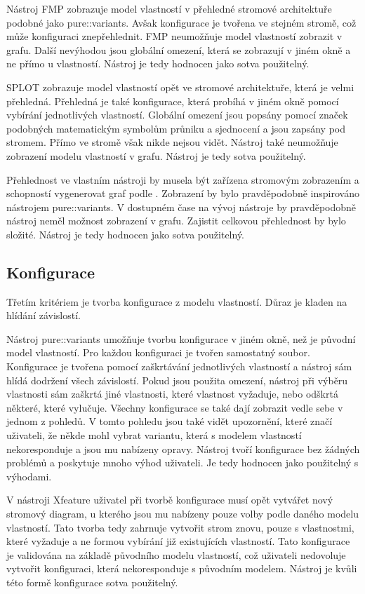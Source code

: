 Nástroj FMP zobrazuje model vlastností v přehledné stromové architektuře podobné jako pure::variants. Avšak konfigurace je tvořena ve stejném stromě, což může konfiguraci znepřehlednit. FMP neumožňuje model vlastností zobrazit v grafu. Další nevýhodou jsou globální omezení, která se zobrazují v jiném okně a ne přímo u vlastností. Nástroj je tedy hodnocen jako sotva použitelný.

SPLOT zobrazuje model vlastností opět ve stromové architektuře, která je velmi přehledná. Přehledná je také konfigurace, která probíhá v jiném okně pomocí vybírání jednotlivých vlastností. Globální omezení jsou popsány pomocí značek podobných matematickým symbolům průniku a sjednocení a jsou zapsány pod stromem. Přímo ve stromě však nikde nejsou vidět. Nástroj také neumožňuje zobrazení modelu vlastností v grafu. Nástroj je tedy sotva použitelný.

Přehlednost ve vlastním nástroji by musela být zařízena stromovým zobrazením a schopností vygenerovat graf podle \cite{Czarnecki98}. Zobrazení by bylo pravděpodobně inspirováno nástrojem pure::variants. V dostupném čase na vývoj nástroje by pravděpodobně nástroj neměl možnost zobrazení v grafu. Zajistit celkovou přehlednost by bylo složité. Nástroj je tedy hodnocen jako sotva použitelný.

\subsection{Konfigurace}
Třetím kritériem je tvorba konfigurace z modelu vlastností. Důraz je kladen na hlídání závislostí.

Nástroj pure::variants umožňuje tvorbu konfigurace v jiném okně, než je původní model vlastností. Pro každou konfiguraci je tvořen samostatný soubor. Konfigurace je tvořena pomocí zaškrtávání jednotlivých vlastností a nástroj sám hlídá dodržení všech závislostí. Pokud jsou použita omezení, nástroj při výběru vlastnosti sám zaškrtá jiné vlastnosti, které vlastnost vyžaduje, nebo odškrtá některé, které vylučuje. Všechny konfigurace se také dají zobrazit vedle sebe v jednom z pohledů. V tomto pohledu jsou také vidět upozornění, které značí uživateli, že někde mohl vybrat variantu, která s modelem vlastností nekoresponduje a jsou mu nabízeny opravy. Nástroj tvoří konfigurace bez žádných problémů a poskytuje mnoho výhod uživateli. Je tedy hodnocen jako použitelný s výhodami.

V nástroji Xfeature uživatel při tvorbě konfigurace musí opět vytvářet nový stromový diagram, u kterého jsou mu nabízeny pouze volby podle daného modelu vlastností. Tato tvorba tedy zahrnuje vytvořit strom znovu, pouze s vlastnostmi, které vyžaduje a ne formou vybírání již existujících vlastností. Tato konfigurace je validována na základě původního modelu vlastností, což uživateli nedovoluje vytvořit konfiguraci, která nekoresponduje s původním modelem. Nástroj je kvůli této formě konfigurace sotva použitelný. 

